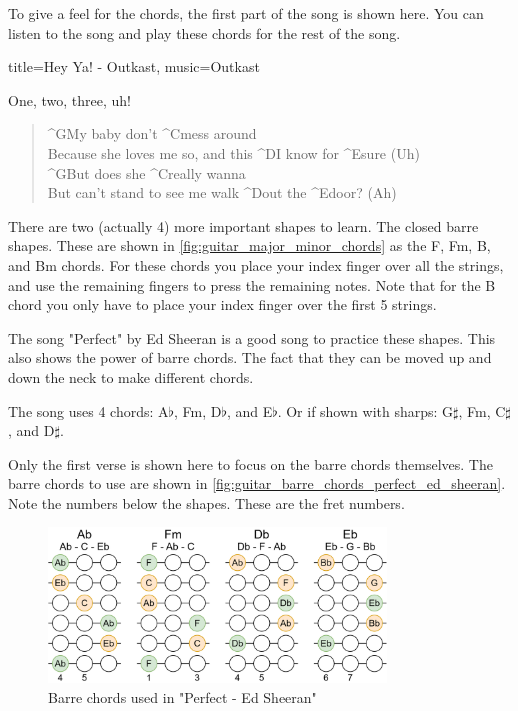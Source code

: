 To give a feel for the chords, the first part of the song is shown here. You can listen to the song and play these chords for the rest of the song.

\begin{song}[verse/numbered, align-chords=l]{title={Hey Ya! - Outkast}, music={Outkast}}
	\begin{intro}
		One, two, three, uh!
	\end{intro}
	\begin{verse}
		^{G}My baby don't ^{C}mess around \\
		Because she loves me so, and this ^{D}I know for ^{E}sure (Uh) \\
		^{G}But does she ^{C}really wanna \\
		But can't stand to see me walk ^{D}out the ^{E}door? (Ah) \\
	\end{verse}
\end{song}

\newpage

There are two (actually 4) more important shapes to learn. The closed barre shapes. These are shown in \autoref{fig:guitar_major_minor_chords} as the F, Fm, B, and Bm chords. For these chords you place your index finger over all the strings, and use the remaining fingers to press the remaining notes. Note that for the B chord you only have to place your index finger over the first 5 strings.

The song "Perfect" by Ed Sheeran is a good song to practice these shapes. This also shows the power of barre chords. The fact that they can be moved up and down the neck to make different chords.

The song uses 4 chords: A$\flat$, Fm, D$\flat$, and E$\flat$. Or if shown with sharps: G$\sharp$, Fm, C$\sharp$, and D$\sharp$.

Only the first verse is shown here to focus on the barre chords themselves. The barre chords to use are shown in \autoref{fig:guitar_barre_chords_perfect_ed_sheeran}. Note the numbers below the shapes. These are the fret numbers.


\begin{figure}[h]
	\centering
	\includegraphics[width=0.8\textwidth]{../../Images/ChordsUsedInPerfectEdSheeran.png}
	\caption{Barre chords used in "Perfect - Ed Sheeran"}
	\label{fig:guitar_barre_chords_perfect_ed_sheeran}
\end{figure}


